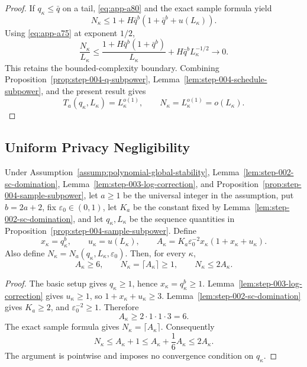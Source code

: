 \begin{proof}
If \(q_\kappa\leq\bar q\) on a tail, \eqref{eq:app-a80} and the exact sample
formula yield
\begin{equation}
N_\kappa
\leq1+H\bar q^b
(1+\bar q^b+u(L_\kappa)).
\label{eq:app-a90}
\end{equation}
Using \eqref{eq:app-a75} at exponent \(1/2\),
\begin{equation}
\frac{N_\kappa}{L_\kappa}
\leq
\frac{1+H\bar q^b(1+\bar q^b)}{L_\kappa}
+H\bar q^bL_\kappa^{-1/2}
\longrightarrow0.
\label{eq:app-a91}
\end{equation}
This retains the bounded-complexity boundary.  Combining
Proposition~\ref{prop:step-004-q-subpower},
Lemma~\ref{lem:step-004-schedule-subpower}, and the present result
gives
\begin{equation}
T_a(q_\kappa,L_\kappa)=L_\kappa^{o(1)},\qquad
N_\kappa=L_\kappa^{o(1)}=o(L_\kappa).
\label{eq:app-a92}
\end{equation}
\end{proof}

\subsection{Uniform Privacy Negligibility}\label{app:privacy-negligibility}

\begin{lemma}
\label{lem:step-005-ceiling}
Under Assumption~\ref{assump:polynomial-global-stability},
Lemma~\ref{lem:step-002-sc-domination},
Lemma~\ref{lem:step-003-log-correction}, and
Proposition~\ref{prop:step-004-sample-subpower}, let \(a\geq1\) be
the universal integer in the assumption, put \(b=2a+2\), fix
\(\varepsilon_0\in(0,1)\), let \(K_a\) be the constant fixed by
Lemma~\ref{lem:step-002-sc-domination}, and let
\(q_\kappa,L_\kappa\) be the sequence quantities in
Proposition~\ref{prop:step-004-sample-subpower}.  Define
\[
x_\kappa=q_\kappa^b,\qquad
u_\kappa=u(L_\kappa),\qquad
A_\kappa=
K_a\varepsilon_0^{-2}
x_\kappa(1+x_\kappa+u_\kappa).
\]
Also define
\(N_\kappa=N_a(q_\kappa,L_\kappa,\varepsilon_0)\).  Then,
for every \(\kappa\),
\begin{equation}
A_\kappa\geq6,\qquad
N_\kappa=\lceil A_\kappa\rceil\geq1,\qquad
N_\kappa\leq2A_\kappa.
\label{eq:app-a93}
\end{equation}
\end{lemma}

\begin{proof}
The basic setup gives \(q_\kappa\geq1\), hence
\(x_\kappa=q_\kappa^b\geq1\).
Lemma~\ref{lem:step-003-log-correction} gives \(u_\kappa\geq1\), so
\(1+x_\kappa+u_\kappa\geq3\).
Lemma~\ref{lem:step-002-sc-domination} gives \(K_a\geq2\), and
\(\varepsilon_0^{-2}\geq1\).  Therefore
\[
A_\kappa
\geq2\cdot1\cdot1\cdot3=6.
\]
The exact sample formula gives \(N_\kappa=\lceil A_\kappa\rceil\).
Consequently
\[
N_\kappa
\leq A_\kappa+1
\leq A_\kappa+\frac16A_\kappa
\leq2A_\kappa.
\]
The argument is pointwise and imposes no convergence condition on
\(q_\kappa\).
\end{proof}

